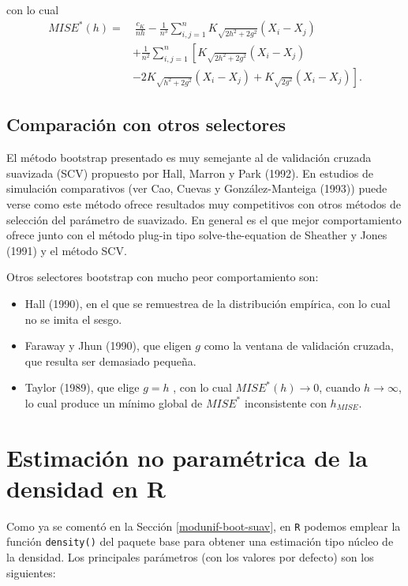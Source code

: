 \documentclass[
]{book}
\theoremstyle{break}
\theoremstyle{nonumberplain}
\begin{document}
con lo cual
\[\begin{aligned}
MISE^{\ast}\left( h \right) =&\ \frac{c_{K}}{nh}-\frac{1}{n^{3}}
\sum_{i,j=1}^{n}K_{\sqrt{2h^2+2g^2}}\left( X_i-X_j \right) \\
&+\frac{1}{n^2}\sum_{i,j=1}^{n}\left[ K_{\sqrt{2h^2+2g^2}}\left(
X_i-X_j \right) \right. \\
&\left. -2K_{\sqrt{h^2+2g^2}}\left( X_i-X_j \right) +K_{\sqrt{2g^2}
}\left( X_i-X_j \right) \right] .
\end{aligned}\]

\subsection{Comparación con otros selectores}\label{comparaciuxf3n-con-otros-selectores}

El método bootstrap presentado es muy semejante al de validación cruzada
suavizada (SCV) propuesto por Hall, Marron y Park (1992). En estudios de
simulación comparativos (ver Cao, Cuevas y González-Manteiga (1993))
puede verse como este método ofrece resultados muy competitivos con
otros métodos de selección del parámetro de suavizado. En general es el
que mejor comportamiento ofrece junto con el método plug-in tipo
solve-the-equation de Sheather y Jones (1991) y el método SCV.

Otros selectores bootstrap con mucho peor comportamiento son:

\begin{itemize}
\item
  Hall (1990), en el que se remuestrea de la distribución empírica,
  con lo cual no se imita el sesgo.
\item
  Faraway y Jhun (1990), que eligen \(g\) como la ventana de validación
  cruzada, que resulta ser demasiado pequeña.
\item
  Taylor (1989), que elige \(g=h\) , con lo cual \(MISE^{\ast}\left(
  h \right) \rightarrow 0\), cuando \(h\rightarrow \infty\), lo cual
  produce un mínimo global de \(MISE^{\ast}\) inconsistente con
  \(h_{MISE}\).
\end{itemize}

\section{Estimación no paramétrica de la densidad en R}\label{npden-r}

Como ya se comentó en la Sección \ref{modunif-boot-suav},
en \texttt{R} podemos emplear la función \texttt{density()} del paquete base para obtener
una estimación tipo núcleo de la densidad.
Los principales parámetros (con los valores por defecto) son los siguientes:
\end{document}
